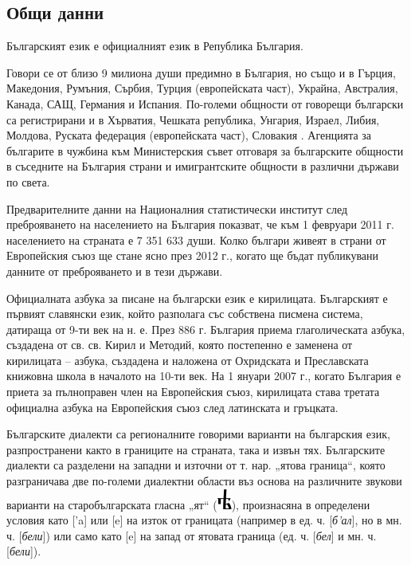 \documentclass[]{../../metanetpaper}
\begin{document}
\begin{multicols}{2}

\subsection{Общи данни}
Българският език е официалният език в Република България.

Говори се от близо 9 милиона души предимно в
 България, но също и в Гърция, Македония, Румъния,
 Сърбия, Турция (европейската
 част), Украйна, Австралия, Канада, САЩ, Германия и Испания. По-големи общности от говорещи български
 са регистрирани и в Хърватия, Чешката република,
 Унгария, Израел, Либия, Молдова, Руската федерация
 (европейската част), Словакия \cite{Ethno}. Агенцията за българите
 в чужбина \cite{ABA} към Министерския съвет отговаря за
 българските общности в съседните на България страни и имигрантските общности в различни държави по света.

Предварителните данни на Националния статистически
 институт \cite{NSI} след преброяването на населението на
 България показват, че към 1 февруари 2011 г.
 населението на страната е 7 351 633 души. Колко
 българи живеят в страни от Европейския съюз ще стане
 ясно през 2012 г., когато ще бъдат публикувани данните
 от преброяването и в тези държави.

Официалната азбука за писане на български език е кирилицата. Българският е първият славянски език, който разполага със собствена писмена система, датираща от 9-ти век на н. е. През 886 г. България приема глаголическата азбука, създадена от св.
 св. Кирил и Методий, която постепенно е заменена от кирилицата
 – азбука, създадена и наложена от Охридската и
 Преславската книжовна школа в началото на 10-ти век. На 1
 януари 2007 г., когато България е приета за пълноправен
 член на Европейския съюз, кирилицата става третата
 официална азбука на Европейския съюз след латинската
 и гръцката.


Българските диалекти са регионалните говорими варианти на българския език, разпространени
 както в границите на страната, така и извън тях. Българските диалекти са разделени на западни и
 източни от т. нар. „ятова граница“, която разграничава
 две по-големи диалектни области въз основа на
 различните звукови варианти на старобългарската
 гласна „ят“ (\includegraphics[scale=0.32]{../_media/bulgarian/yat}), произнасяна в определени условия като
 ['a] или [e] на изток от границата (например в ед. ч.
 [{\it б'ал}], но в мн. ч. [{\it бели}]) или само като [e] на запад от
 ятовата граница (ед. ч. [{\it бел}] и мн. ч. [{\it бели}]).


\end{multicols}
\end{document}
